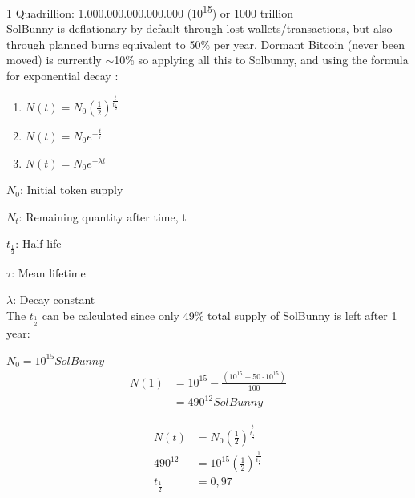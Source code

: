 \documentclass[12pt]{article}
\begin{document}
1 Quadrillion: 1.000.000.000.000.000 (10\textsuperscript{15}) or 1000 trillion \\

SolBunny is deflationary by default through lost wallets/transactions, but also through planned burns equivalent to 50$\%$ per year. Dormant Bitcoin (never been moved) is currently $\sim$10{\%} \cite{btc} so applying all this to Solbunny, and using the formula for exponential decay \cite{decay}: 


\begin{enumerate}[label=(\roman*)]

\item $N(t)=N_{0}(\frac{1}{2})^\frac{t}{t_{\frac{1}{2}}}$

\item  $N(t)=N_{0}e^{-\frac{t}{\tau}}$

\item  $N(t)=N_{0}e^{-\lambda t}$

\end{enumerate}

$N_{0}$: Initial token supply

$N_{t}$: Remaining quantity after time, t

${t_{\frac{1}{2}}}$: Half-life

$\tau$: Mean lifetime

$\lambda$: Decay constant\\

The ${t_{\frac{1}{2}}}$ can be calculated since only 49$\%$ total supply of SolBunny is left after 1 year:

$N_{0} = 10^{15} SolBunny$\\

\begin{equation}\label{init}
\begin{split}
 N(1) &= 10^{15} - \frac{(10^{15} + 50\cdot 10^{15})}{100}\\
 &= 490^{12} SolBunny
\end{split}
\end{equation}

\begin{equation}\label{decay}
\begin{split}
N(t)&=N_{0}(\frac{1}{2})^\frac{t}{t_{\frac{1}{2}}}\\
490^{12}&=10^{15}(\frac{1}{2})^\frac{1}{t_{\frac{1}{2}}}\\
{t_{\frac{1}{2}}} & = 0,97
\end{split}
\end{equation}
\\
\end{document}
